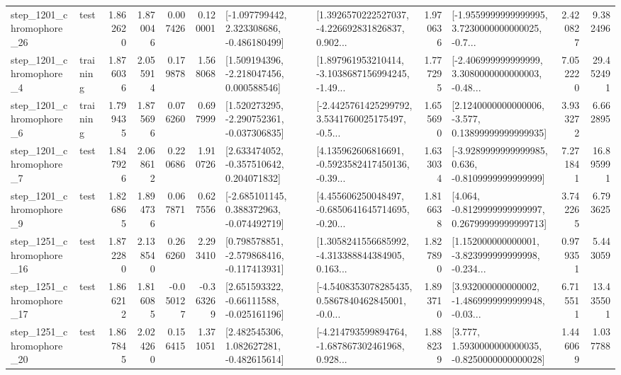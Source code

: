 \begin{tabular}{llrrrrllrlrr}
 step\_1201\_chromophore\_26 &      test &      1.862620 &    1.870046 &      0.007426 &  0.120001 &   [-1.097799442, 2.323308686, -0.486180499] &  [1.3926570222527037, -4.226692831826837, 0.902... &       1.970636 &  [-1.9559999999999995, 3.7230000000000025, -0.7... &            2.420827 &          9.382496 \\
  step\_1201\_chromophore\_4 &  training &      1.876036 &    2.055914 &      0.179878 &  1.568068 &    [1.509194396, -2.218047456, 0.000588546] &  [1.897961953210414, -3.1038687156994245, -1.49... &       1.777295 &  [-2.406999999999999, 3.3080000000000003, -0.48... &            7.052220 &         29.452491 \\
  step\_1201\_chromophore\_6 &  training &      1.799435 &    1.875696 &      0.076260 &  0.697999 &   [1.520273295, -2.290752361, -0.037306835] &  [-2.4425761425299792, 3.5341760025175497, -0.5... &       1.655690 &  [2.1240000000000006, -3.577, 0.13899999999999935] &            3.933272 &          6.662895 \\
  step\_1201\_chromophore\_7 &      test &      1.847926 &    2.068612 &      0.220686 &  1.910726 &    [2.633474052, -0.357510642, 0.204071832] &  [4.135962606816691, -0.5923582417450136, -0.39... &       1.633034 &  [-3.9289999999999985, 0.636, -0.8109999999999999] &            7.271841 &         16.895991 \\
  step\_1201\_chromophore\_9 &      test &      1.826865 &    1.894736 &      0.067871 &  0.627556 &   [-2.685101145, 0.388372963, -0.074492719] &  [4.455606250048497, -0.6850641645714695, -0.20... &       1.816638 &  [4.064, -0.8129999999999997, 0.26799999999999713] &            3.742265 &          6.793625 \\
 step\_1251\_chromophore\_16 &      test &      1.872280 &    2.138540 &      0.266260 &  2.293410 &   [0.798578851, -2.579868416, -0.117413931] &  [1.3058241556685992, -4.313388844384905, 0.163... &       1.827890 &  [1.152000000000001, -3.823999999999998, -0.234... &            0.979351 &          5.443059 \\
 step\_1251\_chromophore\_17 &      test &      1.866212 &    1.816085 &     -0.050127 & -0.363269 &    [2.651593322, -0.66111588, -0.025161196] &  [-4.5408353078285435, 0.5867840462845001, -0.0... &       1.893710 &  [3.932000000000002, -1.4869999999999948, -0.03... &            6.715511 &         13.435501 \\
 step\_1251\_chromophore\_20 &      test &      1.867845 &    2.024260 &      0.156415 &  1.371051 &    [2.482545306, 1.082627281, -0.482615614] &  [-4.214793599894764, -1.687867302461968, 0.928... &       1.888239 &   [3.777, 1.5930000000000035, -0.8250000000000028] &            1.446069 &          1.037788 \\

\end{tabular}
